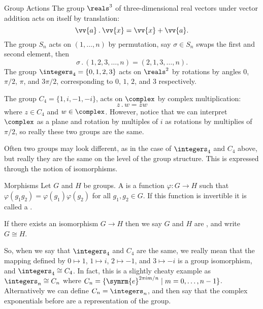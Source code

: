 \documentclass[fleqn]{NotesClass}
\newcommand{\cyclicGroupZ}[1][n]{\integers_{#1}}
\newcommand{\cyclicGroupC}[1][n]{C_{#1}}
\newcommand{\action}{\mathbin{.}}
\newcommand{\e}{\symrm{e}}
\newcommand{\isomorphic}{\cong}
\begin{document}
    \begin{exm}{Group Actions}{}
        The group \(\reals^3\) of three-dimensional real vectors under vector addition acts on itself by translation:
        \begin{equation}
            \vv{a} \action \vv{x} = \vv{x} + \vv{a}.
        \end{equation}
        The group \(S_n\) acts on \((1, \dotsc, n)\) by permutation, say \(\sigma \in S_n\) swaps the first and second element, then
        \begin{equation}
            \sigma \action (1, 2, 3, \dotsc, n) = (2, 1, 3, \dotsc, n).
        \end{equation}
        The group \(\cyclicGroupZ[4] = \{0, 1, 2, 3\}\) acts on \(\reals^2\) by rotations by angles \(0\), \(\pi/2\), \(\pi\), and \(3\pi/2\), corresponding to \(0\), \(1\), \(2\), and \(3\) respectively.
        
        The group \(\cyclicGroupC[4] = \{1, i, -1, -i\}\), acts on \(\complex\) by complex multiplication:
        \begin{equation}
            z \action w = zw
        \end{equation}
        where \(z \in \cyclicGroupC[4]\) and \(w \in \complex\).
        However, notice that we can interpret \(\complex\) as a plane and rotation by multiples of \(i\) as rotations by multiplies of \(\pi/2\), so really these two groups are the same.
    \end{exm}

    Often two groups may look different, as in the case of \(\cyclicGroupZ[4]\) and \(\cyclicGroupC[4]\) above, but really they are the same on the level of the group structure.
    This is expressed through the notion of isomorphisms.
    
    \begin{dfn}{Morphisms}{}
        Let \(G\) and \(H\) be groups.
        A  is a function \(\varphi \colon G \to H\) such that \(\varphi(g_1 g_2) = \varphi(g_1)\varphi(g_2)\) for all \(g_1, g_2 \in G\).
        If this function is invertible it is called a .
        
        If there exists an isomorphism \(G \to H\) then we say \(G\) and \(H\) are , and write \(G \isomorphic H\).
    \end{dfn}
    
    So, when we say that \(\cyclicGroupZ[4]\) and \(\cyclicGroupC[4]\) are the same, we really mean that the mapping defined by \(0 \mapsto 1\), \(1 \mapsto i\), \(2 \mapsto -1\), and \(3 \mapsto -i\) is a group isomorphism, and \(\cyclicGroupZ[4] \isomorphic \cyclicGroupC[4]\).
    In fact, this is a slightly cheaty example as \(\cyclicGroupZ[n] \isomorphic \cyclicGroupC[n]\) where \(\cyclicGroupC[n] = \{\e^{2\pi i m/n} \mid m = 0, \dotsc, n - 1\}\).
    Alternatively we can define \(\cyclicGroupC[n] = \cyclicGroupZ[n]\), and then say that the complex exponentials before are a representation of the group.
    
\end{document}
